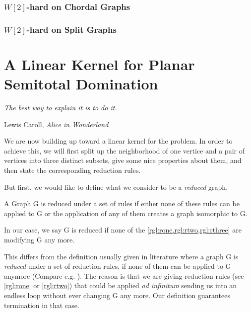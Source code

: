 

\subsection{\hmath $W[2]$-hard on Chordal Graphs}

\subsection{\hmath $W[2]$-hard on Split Graphs}

\chapter{A Linear Kernel for Planar Semitotal Domination}

\epigraph{\itshape The best way to explain it is to do it.}{Lewis Caroll, \textit{Alice in Wonderland}}

We are now building up toward a linear kernel for the \sdom problem. In order to achieve this, we will first split up the neighborhood of one vertice and a pair of vertices into three distinct subsets, give some nice properties about them, and then state the corresponding reduction rules.  



But first, we would like to define what we consider to be a \textit{reduced} graph. 

\begin{definition}
    A Graph G is reduced under a set of rules if either none of these rules can be applied to G or the application of any of them creates a graph isomorphic to G.
\end{definition}\label{def:reduced}

In our case, we say G is reduced if none of the \cref{rgl:rone,rgl:rtwo,rgl:rthree} are modifying G any more.

This differs from the definition usually given in literature where a graph G is \textit{reduced} under a set of reduction rules, if none of them can be applied to G anymore (Compare e.g. \cite{Fomin2019}). The reason is that we are giving reduction rules (see \cref{rgl:rone} or \cref{rgl:rtwo}) that could be applied \textit{ad infinitum} sending us into an endless loop without ever changing G any more. Our definition guarantees termination in that case.

